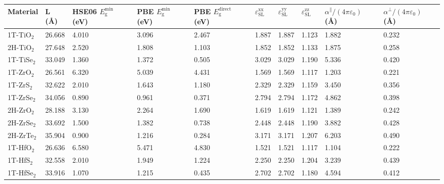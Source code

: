 % 

\begin{center}
  \footnotesize
\setlongtables
\begin{tabularx}{\linewidth}{lXXXXXXXXX}
      \caption{Raw data of the materials calculated in this study.}\\
    \hline
    Material & L (\AA) & HSE06 $E_{\mathrm{g}}^{\mathrm{min}}$ (eV) & PBE $E_{\mathrm{g}}^{\mathrm{min}}$ (eV) & PBE $E_{\mathrm{g}}^{\mathrm{direct}}$ (eV) & $\varepsilon_{\mathrm{SL}}^{\mathrm{xx}}$ & $\varepsilon_{\mathrm{SL}}^{\mathrm{yy}}$ & $\varepsilon_{\mathrm{SL}}^{\mathrm{zz}}$ & $\alpha^{\parallel}/(4\pi \varepsilon_{0})$ (\AA) & $\alpha^{\perp}/(4\pi \varepsilon_{0})$ (\AA)\\
    \hline
    \endhead
    1T-TiO$_{2}$ & 26.668  & 4.010  & 3.096  & 2.467  & 1.887  & 1.887  & 1.123  & 1.882  & 0.232 \\
    2H-TiO$_{2}$ & 27.648  & 2.520  & 1.808  & 1.103  & 1.852  & 1.852  & 1.133  & 1.875  & 0.258 \\
    1T-TiSe$_{2}$ & 33.049  & 1.360  & 1.372  & 0.505  & 3.029  & 3.029  & 1.190  & 5.336  & 0.420 \\
    1T-ZrO$_{2}$ & 26.561  & 6.320  & 5.039  & 4.431  & 1.569  & 1.569  & 1.117  & 1.203  & 0.221 \\
    1T-ZrS$_{2}$ & 32.622  & 2.010  & 1.643  & 1.180  & 2.329  & 2.329  & 1.159  & 3.450  & 0.356 \\
    1T-ZrSe$_{2}$ & 34.056  & 0.890  & 0.961  & 0.371  & 2.794  & 2.794  & 1.172  & 4.862  & 0.398 \\
    2H-ZrO$_{2}$ & 28.188  & 3.130  & 2.264  & 1.690  & 1.619  & 1.619  & 1.121  & 1.389  & 0.242 \\
    2H-ZrSe$_{2}$ & 33.692  & 1.500  & 1.382  & 0.738  & 2.448  & 2.448  & 1.190  & 3.882  & 0.428 \\
    2H-ZrTe$_{2}$ & 35.904  & 0.900  & 1.216  & 0.284  & 3.171  & 3.171  & 1.207  & 6.203  & 0.490 \\
    1T-HfO$_{2}$ & 26.636  & 6.580  & 5.471  & 4.830  & 1.521  & 1.521  & 1.117  & 1.104  & 0.222 \\
    1T-HfS$_{2}$ & 32.558  & 2.010  & 1.949  & 1.224  & 2.250  & 2.250  & 1.204  & 3.239  & 0.439 \\
    1T-HfSe$_{2}$ & 33.916  & 1.070  & 1.215  & 0.435  & 2.702  & 2.702  & 1.180  & 4.594  & 0.412 \\

\end{tabularx}
\end{center}
